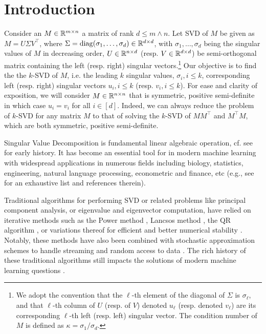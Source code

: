 \section{Introduction}

 Consider an $M \in \mathbb{R}^{m \times n}$ a matrix of rank $d \le m \wedge n$. Let
SVD of $M$ be given as $M = U \Sigma V^\top$, where $\Sigma = \operatorname{diag}(\sigma_1, \dots, \sigma_d) \in \mathbb{R}^{d \times d}$, 
with $ \sigma_1, \dots,\sigma_d$ being the singular values of $M$ in decreasing order,  
$U \in \mathbb{R}^{n \times d}$ (resp. $V \in \mathbb{R}^{d \times d}$) be semi-orthogonal matrix containing 
the left (resp. right) singular vectors.\footnote{We adopt the convention that the $\ell$-th element of 
the diagonal of $\Sigma$ is $\sigma_\ell$, and that $\ell$-th column of $U$ (resp. of $V$) denoted 
$u_\ell$ (resp. denoted $v_\ell$) are its corresponding $\ell$-th left (resp. left) singular vector. 
The condition number of $M$ is defined as $\kappa = \sigma_1 / \sigma_d$.} 
Our objective is to find the the $k$-SVD of $M$, i.e. the leading $k$ singular 
values, $\sigma_i, i\leq k$,  corresponding left (resp. right) singular vectors 
$u_i, i\leq k$ (resp. $v_i, i\leq k$). For ease and clarity of exposition, we will 
consider $M \in \mathbb{R}^{n\times n}$ that is symmetric, positive semi-definite 
in which case $u_i = v_i$ for all $i \in [d]$. Indeed, we can always reduce the problem of 
$k$-SVD for any matrix $M$ to that of solving the $k$-SVD of $M M^\top$ and $M^\top M$, which are both
symmetric, positive semi-definite.


\medskip
{} Singular Value Decomposition is fundamental linear algebraic operation, cf. see \cite{stewart1993early} for early history. It has become an essential tool for in modern machine learning 
with widespread applications in numerous fields including biology, statistics, engineering, natural language processing, 
econometric and finance, etc (e.g., see \cite{chen2021spectral} for an exhaustive list and references therein).  

Traditional algorithms for performing SVD or related problems like principal component analysis, or eigenvalue and eigenvector computation, have relied on iterative methods such as the Power method \cite{mises1929praktische}, Lancsos method \cite{lanczos1950iteration}, the QR algorithm \cite{francis1961qr}, or variations thereof for efficient and better numerical stability \cite{cullum2002lanczos}. Notably, these methods have also been combined with stochastic approximation schemes to handle streaming and random access to data \cite{oja1985stochastic}. The rich history of these traditional algorithms still impacts the solutions of modern machine learning questions \cite{arora2012stochastic, hardt2014noisy, garber2015fast, shamir2015stochastic, garber2016faster}. 

